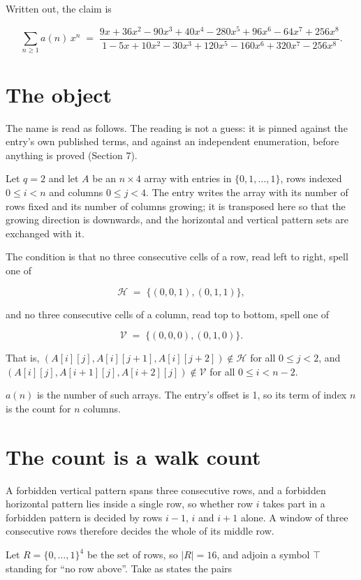\documentclass[11pt]{article}
\theoremstyle{definition}
\begin{document}
Written out, the claim is

\[\sum_{n \ge 1} a(n)\,x^n \;=\; \frac{9x + 36x^{2} - 90x^{3} + 40x^{4} - 280x^{5} + 96x^{6} - 64x^{7} + 256x^{8}}{1 - 5x + 10x^{2} - 30x^{3} + 120x^{5} - 160x^{6} + 320x^{7} - 256x^{8}}.\]

\section{The object}

The name is read as follows. The reading is not a guess: it is pinned against the entry's own published terms, and against an independent enumeration, before anything is proved (Section 7).

Let $q = 2$ and let $A$ be an $n \times 4$ array with entries in $\{0,1,\dots,1\}$, rows indexed $0 \le i < n$ and columns $0 \le j < 4$. The entry writes the array with its number of rows fixed and its number of columns growing; it is transposed here so that the growing direction is downwards, and the horizontal and vertical pattern sets are exchanged with it.

The condition is that no three consecutive cells of a row, read left to right, spell one of

\[\mathcal{H} \;=\; \{(0,0,1), (0,1,1)\},\]

and no three consecutive cells of a column, read top to bottom, spell one of

\[\mathcal{V} \;=\; \{(0,0,0), (0,1,0)\}.\]

That is, $(A[i][j],A[i][j{+}1],A[i][j{+}2]) \notin \mathcal{H}$ for all $0 \le j < 2$, and $(A[i][j],A[i{+}1][j],A[i{+}2][j]) \notin \mathcal{V}$ for all $0 \le i < n-2$.

$a(n)$ is the number of such arrays. The entry's offset is 1, so its term of index $n$ is the count for $n$ columns.

\section{The count is a walk count}

A forbidden vertical pattern spans three consecutive rows, and a forbidden horizontal pattern lies inside a single row, so whether row $i$ takes part in a forbidden pattern is decided by rows $i-1$, $i$ and $i+1$ alone. A window of three consecutive rows therefore decides the whole of its middle row.

Let $R = \{0,\dots,1\}^{4}$ be the set of rows, so $|R| = 16$, and adjoin a symbol $\top$ standing for ``no row above''. Take as states the pairs
\end{document}
